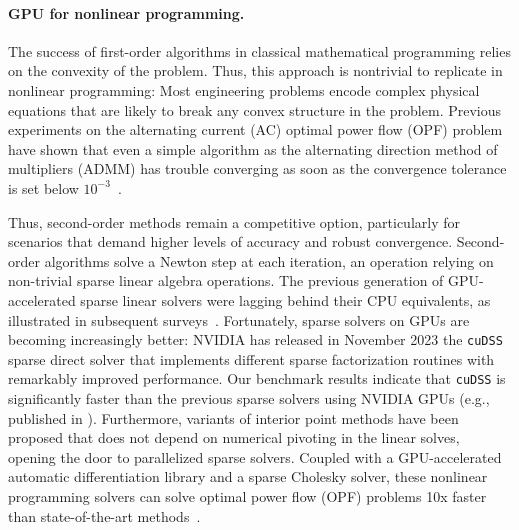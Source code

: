 \paragraph{GPU for nonlinear programming.}
The success of first-order algorithms in classical mathematical programming
relies on the convexity of the problem. Thus, this approach is nontrivial to replicate
in nonlinear programming: Most engineering problems encode complex
physical equations that are likely to break any convex structure in the problem.
Previous experiments on the alternating current (AC) optimal power flow (OPF) problem have shown that even a simple
algorithm as the alternating direction method of multipliers (ADMM) has trouble converging as soon as the convergence
tolerance is set below $10^{-3}$~\cite{kimLeveragingGPUBatching2021}.

Thus, second-order methods remain a competitive option, particularly
for scenarios that demand higher levels of accuracy and robust convergence.
Second-order algorithms solve a Newton step at each
iteration, an operation relying on non-trivial sparse linear algebra operations.
The previous generation of GPU-accelerated sparse linear
solvers were lagging behind their CPU equivalents, as illustrated in
subsequent surveys~\cite{swirydowicz2021linear,tasseff2019exploring}.
Fortunately, sparse solvers on GPUs are becoming increasingly better: NVIDIA has released in November 2023
the {\tt cuDSS} sparse direct solver that implements different sparse factorization routines with remarkably improved performance.
Our benchmark results indicate that {\tt cuDSS} is significantly faster than the previous sparse solvers using NVIDIA GPUs (e.g., published in \cite{shin2023accelerating}).
Furthermore, variants of interior point methods have been proposed
that does not depend on numerical pivoting in the linear solves,
opening the door to parallelized sparse solvers.
Coupled with a GPU-accelerated automatic differentiation library and a
sparse Cholesky solver, these nonlinear programming solvers can solve
optimal power flow (OPF) problems 10x faster than state-of-the-art
methods~\cite{shin2023accelerating}.

